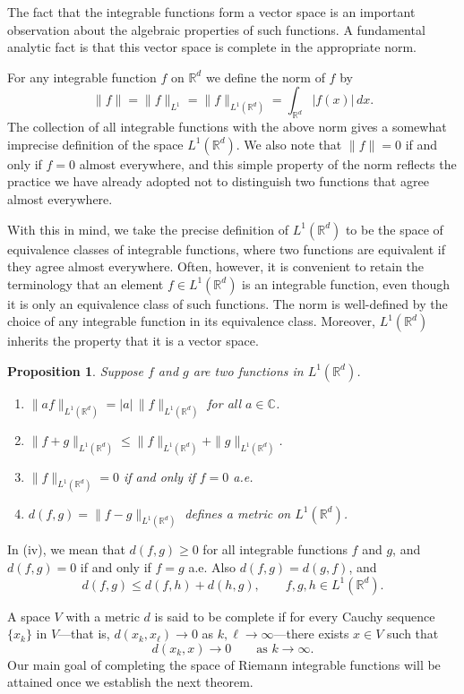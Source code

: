 \documentclass[11pt,openany]{book}
\newtheorem{proposition}[theorem]{Proposition}
\begin{document}
The fact that the integrable functions form a vector space is an important observation about the algebraic properties of such functions. A fundamental analytic fact is that this vector space is complete in the appropriate norm.

For any integrable function $f$ on $\mathbb{R}^d$ we define the norm of $f$ by
\[
\|f\|=\|f\|_{L^1}=\|f\|_{L^1(\mathbb{R}^d)}
=\int_{\mathbb{R}^d}|f(x)|\,dx.
\]
The collection of all integrable functions with the above norm gives a somewhat imprecise definition of the space $L^1(\mathbb{R}^d)$. We also note that $\|f\|=0$ if and only if $f=0$ almost everywhere, and this simple property of the norm reflects the practice we have already adopted not to distinguish two functions that agree almost everywhere.

With this in mind, we take the precise definition of $L^1(\mathbb{R}^d)$ to be the space of equivalence classes of integrable functions, where two functions are equivalent if they agree almost everywhere. Often, however, it is convenient to retain the terminology that an element $f\in L^1(\mathbb{R}^d)$ is an integrable function, even though it is only an equivalence class of such functions. The norm is well-defined by the choice of any integrable function in its equivalence class. Moreover, $L^1(\mathbb{R}^d)$ inherits the property that it is a vector space.

\begin{proposition}
Suppose $f$ and $g$ are two functions in $L^1(\mathbb{R}^d)$.
\begin{enumerate}
\item[(i)] $\|af\|_{L^1(\mathbb{R}^d)}=|a|\,\|f\|_{L^1(\mathbb{R}^d)}$ for all $a\in\mathbb{C}$.
\item[(ii)] $\|f+g\|_{L^1(\mathbb{R}^d)}\leq\|f\|_{L^1(\mathbb{R}^d)}+\|g\|_{L^1(\mathbb{R}^d)}$.
\item[(iii)] $\|f\|_{L^1(\mathbb{R}^d)}=0$ if and only if $f=0$ a.e.
\item[(iv)] $d(f,g)=\|f-g\|_{L^1(\mathbb{R}^d)}$ defines a metric on $L^1(\mathbb{R}^d)$.
\end{enumerate}
\end{proposition}

In (iv), we mean that $d(f,g)\geq0$ for all integrable functions $f$ and $g$, and $d(f,g)=0$ if and only if $f=g$ a.e. Also $d(f,g)=d(g,f)$, and
\[
d(f,g)\leq d(f,h)+d(h,g),
\qquad f,g,h\in L^1(\mathbb{R}^d).
\]

A space $V$ with a metric $d$ is said to be complete if for every Cauchy sequence $\{x_k\}$ in $V$---that is, $d(x_k,x_\ell)\to0$ as $k,\ell\to\infty$---there exists $x\in V$ such that
\[
d(x_k,x)\to0\qquad\text{as }k\to\infty.
\]
Our main goal of completing the space of Riemann integrable functions will be attained once we establish the next theorem.
\end{document}
